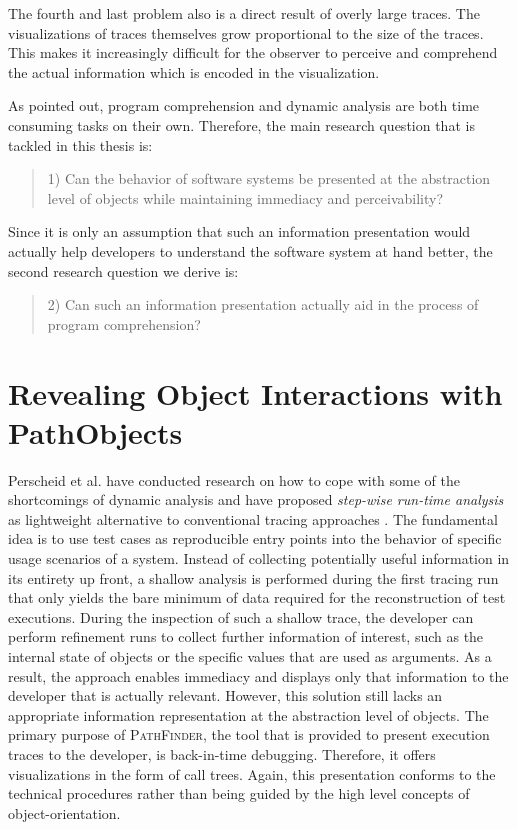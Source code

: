 The fourth and last problem also is a direct result of overly large traces.
The visualizations of traces themselves grow proportional to the size of the traces.
This makes it increasingly difficult for the observer to perceive and comprehend the actual information which is encoded in the visualization.

As pointed out, program comprehension and dynamic analysis are both time consuming tasks on their own. Therefore, the main research question that is tackled in this thesis is:

\begin{quote}
1) Can the behavior of software systems be presented at the abstraction level of objects while maintaining immediacy and perceivability?
\end{quote}

Since it is only an assumption that such an information presentation would actually help developers to understand the software system at hand better, the second research question we derive is:

\begin{quote}
2) Can such an information presentation actually aid in the process of program comprehension?
\end{quote}


\section{Revealing Object Interactions with PathObjects}

Perscheid et al. have conducted research on how to cope with some of the shortcomings of dynamic analysis and have proposed \emph{step-wise run-time analysis} as lightweight alternative to conventional tracing approaches \cite{perscheid_immediacy_2010}.
The fundamental idea is to use test cases as reproducible entry points into the behavior of specific usage scenarios of a system.
Instead of collecting potentially useful information in its entirety up front, a shallow analysis is performed during the first tracing run that only yields the bare minimum of data required for the reconstruction of test executions.
During the inspection of such a shallow trace, the developer can perform refinement runs to collect further information of interest, such as the internal state of objects or the specific values that are used as arguments.
As a result, the approach enables immediacy and displays only that information to the developer that is actually relevant.
However, this solution still lacks an appropriate information representation at the abstraction level of objects.
The primary purpose of \textsc{PathFinder}, the tool that is provided to present execution traces to the developer, is back-in-time debugging.
Therefore, it offers visualizations in the form of call trees.
Again, this presentation conforms to the technical procedures rather than being guided by the high level concepts of object-orientation.

